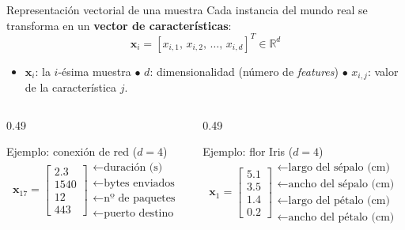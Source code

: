 \documentclass[10pt,aspectratio=169]{beamer}
\begin{document}
\begin{frame}{Representación vectorial de una muestra}
  Cada instancia del mundo real se transforma en un \textbf{vector de características}:
  \[
    \mathbf{x}_i = [x_{i,1},\, x_{i,2},\, \dots,\, x_{i,d}]^{T} \in \mathbb{R}^{d}
  \]
  \begin{itemize}
    \item $\mathbf{x}_i$: la $i$-ésima muestra \quad $\bullet$ \quad $d$: dimensionalidad (número de \emph{features}) \quad $\bullet$ \quad $x_{i,j}$: valor de la característica $j$.
  \end{itemize}
  \medskip
  \begin{columns}[T]
    \begin{column}{0.49\textwidth}
      \begin{exampleblock}{Ejemplo: conexión de red ($d=4$)}
        \small
        \[
          \mathbf{x}_{17} =
          \begin{bmatrix} 2.3 \\ 1540 \\ 12 \\ 443 \end{bmatrix}
          \begin{array}{l}
            \leftarrow \text{duración (s)} \\
            \leftarrow \text{bytes enviados} \\
            \leftarrow \text{nº de paquetes} \\
            \leftarrow \text{puerto destino}
          \end{array}
        \]
      \end{exampleblock}
    \end{column}
    \begin{column}{0.49\textwidth}
      \begin{exampleblock}{Ejemplo: flor Iris ($d=4$)}
        \small
        \[
          \mathbf{x}_{1} =
          \begin{bmatrix} 5.1 \\ 3.5 \\ 1.4 \\ 0.2 \end{bmatrix}
          \begin{array}{l}
            \leftarrow \text{largo del sépalo (cm)} \\
            \leftarrow \text{ancho del sépalo (cm)} \\
            \leftarrow \text{largo del pétalo (cm)} \\
            \leftarrow \text{ancho del pétalo (cm)}
          \end{array}
        \]
      \end{exampleblock}
    \end{column}
  \end{columns}
\end{frame}
\end{document}
